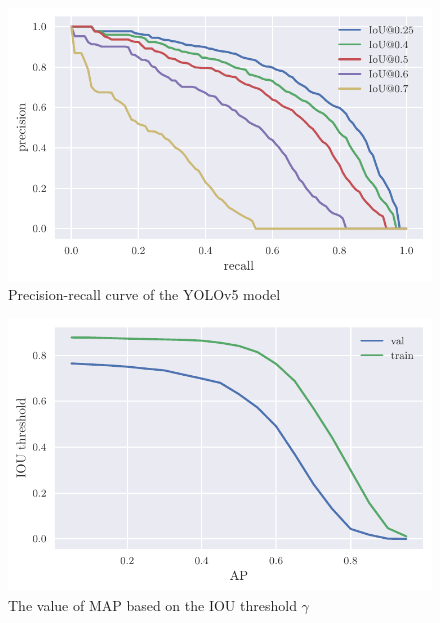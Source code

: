 \begin{paracol}{2}
    \begin{figure}
        \includegraphics[width=\linewidth]{images/iou_val_multiple.pdf}
        \caption{Precision-recall curve of the YOLOv5 model}
        \label{fig:yolov5_pr_curves}
    \end{figure}
    \switchcolumn
    \begin{figure}
        \includegraphics[width=\linewidth]{images/iou_threshold.pdf}
        \caption{The value of MAP based on the IOU threshold $\gamma$}
        \label{fig:yolov5_map_iou_thresholds}
    \end{figure}
\end{paracol}

